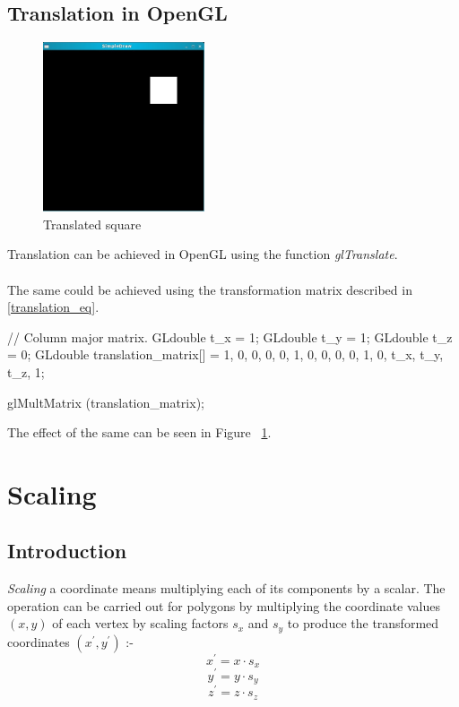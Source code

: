 \documentclass[a4paper,12pt,titlepage,twosided]{article}
\begin{document}
	\subsection{Translation in OpenGL}
		\begin{figure}[h]
			\centering
			\includegraphics[height=50mm]{Images_final/Translated_square.jpg}
			\caption{Translated square}
			\label{fig:translated}
		\end{figure}
		Translation can be achieved in OpenGL using the function \emph{glTranslate}. \\ \\
		The same could be achieved using the transformation matrix described in \eqref{translation_eq}.
		\begin{code}
			// Column major matrix.
			GLdouble t_x = 1;
			GLdouble t_y = 1;
			GLdouble t_z = 0;
			GLdouble translation_matrix[] = { 1, 0, 0, 0,
							  0, 1, 0, 0,
							  0, 0, 1, 0,
							  t_x, t_y, t_z, 1};	

			glMultMatrix (translation_matrix);
		\end{code}
		The effect of the same can be seen in Figure ~\ref{fig:translated}.
	
		
\pagebreak
\pagebreak
\section{Scaling}
	\subsection{Introduction}
	\emph{Scaling} a coordinate means multiplying each of its components by a scalar. The operation can be carried out for polygons by multiplying the coordinate values $(x,y)$ of each vertex by scaling factors $s_x$ and $s_y$ to produce the transformed coordinates $(x^{'},y^{'})$ :-
	\begin{equation*}
		x^{'} = x \cdot s_x 
	\end{equation*}
	\begin{equation*}
		y^{'} = y \cdot s_y
	\end{equation*}
	\begin{equation*}
		z^{'} = z \cdot s_z
	\end{equation*}
\end{document}
